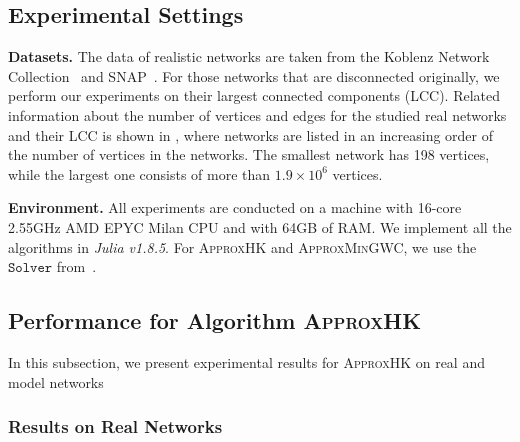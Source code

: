 \documentclass[10pt,twocolumn,twoside]{IEEEtran}
\begin{document}
\subsection{Experimental Settings}

\textbf{Datasets.} The data of realistic networks are taken from the Koblenz Network Collection~\cite{Ku13} and SNAP~\cite{LeKr14}. For those networks that are disconnected originally, we perform our experiments on their largest connected components (LCC). Related information about the number of vertices and edges for the studied real networks and their LCC is shown  in ,  where networks are listed in an increasing order of the number of vertices in the networks. The smallest network has 198 vertices, while the largest one consists of more than \(1.9 \times 10^{6}\) vertices.

\textbf{Environment.} All experiments are conducted on a machine with 16-core 2.55GHz AMD EPYC Milan CPU and with 64GB of RAM. We implement all the  algorithms in \textit{Julia v1.8.5}. For  \textsc{ApproxHK}  and  \textsc{ApproxMinGWC}, we use the  \(\mathtt{Solver}\) from~\cite{GaKySp23}. %

\subsection{Performance for Algorithm \textsc{ApproxHK} }

In this subsection, we present experimental results for \textsc{ApproxHK} on real and model networks

\subsubsection{Results on Real Networks}
\end{document}

